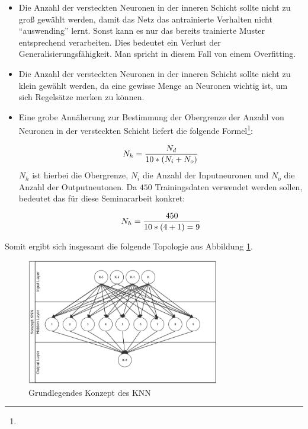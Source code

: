 \begin{itemize}
\item Die Anzahl der versteckten Neuronen in der inneren Schicht sollte nicht zu groß gewählt werden, damit das Netz das antrainierte Verhalten nicht "`auswending"' lernt. Sonst kann es nur das bereits trainierte Muster entsprechend verarbeiten. Dies bedeutet ein Verlust der Generalisierungsfähigkeit. Man spricht in diesem Fall von einem Overfitting.

\item Die Anzahl der versteckten Neuronen in der inneren Schicht sollte nicht zu klein gewählt werden, da eine gewisse Menge an Neuronen wichtig ist, um sich Regelsätze merken zu können.

\item Eine grobe Annäherung zur Bestimmung der Obergrenze der Anzahl von Neuronen in der versteckten Schicht liefert die folgende Formel\footnote{\Vgl{}}:

\begin{equation}\formelentry{Optimale Anzahl Neuronen in der versteckten Schicht}
  N_h = \frac{N_d}{10*(N_i+N_o)}
\end{equation}
$N_h$ ist hierbei die Obergrenze, $N_i$ die Anzahl der Inputneuronen und $N_o$ die Anzahl der Outputneutonen. Da $450$ Trainingsdaten verwendet werden sollen, bedeutet das für diese Seminararbeit konkret:

\begin{equation}\formelentry{Optimale Anzahl Neuronen in der versteckten Schicht}
  N_h = \frac{450}{10*(4+1) = 9 }   
\end{equation}
\end{itemize}
 
Somit ergibt sich insgesamt die folgende Topologie aus Abbildung \ref{fig:Grundlegende Topologie des KNN}. 

\begin{figure}[H]
\centering
		\includegraphics[width=0.75\textwidth]{KonzKNN.PNG}
	\caption{Grundlegendes Konzept des KNN}
	\label{fig:Grundlegende Topologie des KNN}
\end{figure}

